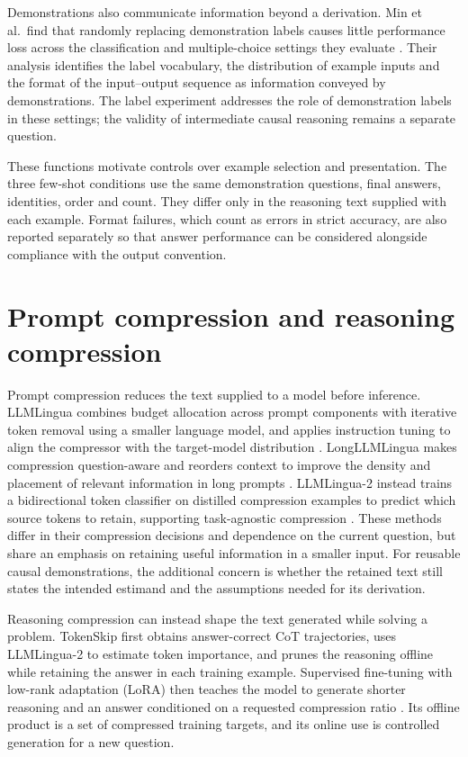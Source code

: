 Demonstrations also communicate information beyond a derivation. Min et al.\ find that randomly replacing demonstration labels causes little performance loss across the classification and multiple-choice settings they evaluate \cite{min-etal-2022-rethinking}. Their analysis identifies the label vocabulary, the distribution of example inputs and the format of the input--output sequence as information conveyed by demonstrations. The label experiment addresses the role of demonstration labels in these settings; the validity of intermediate causal reasoning remains a separate question.

These functions motivate controls over example selection and presentation. The three few-shot conditions use the same demonstration questions, final answers, identities, order and count. They differ only in the reasoning text supplied with each example. Format failures, which count as errors in strict accuracy, are also reported separately so that answer performance can be considered alongside compliance with the output convention.

\section{Prompt compression and reasoning compression}\label{sec:2.3}

Prompt compression reduces the text supplied to a model before inference. LLMLingua combines budget allocation across prompt components with iterative token removal using a smaller language model, and applies instruction tuning to align the compressor with the target-model distribution \cite{jiang-etal-2023-llmlingua}. LongLLMLingua makes compression question-aware and reorders context to improve the density and placement of relevant information in long prompts \cite{jiang-etal-2024-longllmlingua}. LLMLingua-2 instead trains a bidirectional token classifier on distilled compression examples to predict which source tokens to retain, supporting task-agnostic compression \cite{pan-etal-2024-llmlingua}. These methods differ in their compression decisions and dependence on the current question, but share an emphasis on retaining useful information in a smaller input. For reusable causal demonstrations, the additional concern is whether the retained text still states the intended estimand and the assumptions needed for its derivation.

Reasoning compression can instead shape the text generated while solving a problem. TokenSkip first obtains answer-correct CoT trajectories, uses LLMLingua-2 to estimate token importance, and prunes the reasoning offline while retaining the answer in each training example. Supervised fine-tuning with low-rank adaptation (LoRA) then teaches the model to generate shorter reasoning and an answer conditioned on a requested compression ratio \cite{xia-etal-2025-tokenskip}. Its offline product is a set of compressed training targets, and its online use is controlled generation for a new question.

